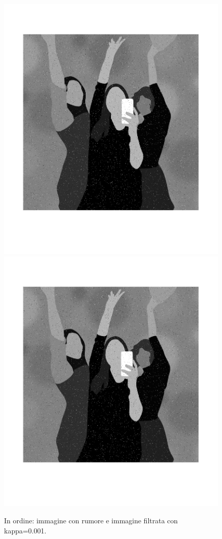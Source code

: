 \begin{figure}[htb] \centering
\includegraphics[scale=0.15,trim={0 3cm 0 5cm},clip]{Pictures/Esempi di utilizzo/Esempio 4/party_caso_limite_originale.png}
\includegraphics[scale=0.15,trim={0 3cm 0 5cm},clip]{Pictures/Esempi di utilizzo/Esempio 4/party_caso_limite_kappabasso.png}
\caption{In ordine: immagine con rumore e immagine filtrata con kappa=0.001.}\label{fig:figura}
\end{figure} 
